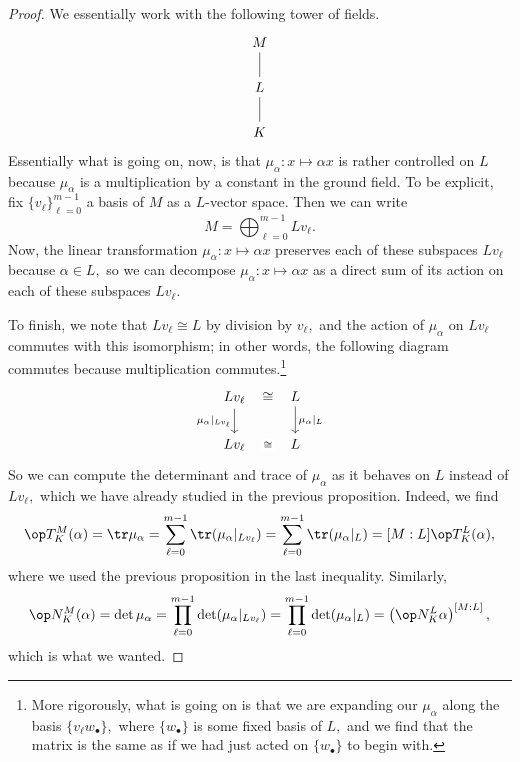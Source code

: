 \documentclass[../notes.tex]{subfiles}
\begin{document}
\begin{proof}
	We essentially work with the following tower of fields.
	\[\begin{tikzcd}
		M \\
		L \\
		K
		\arrow[no head, from=3-1, to=2-1]
		\arrow[no head, from=2-1, to=1-1]
	\end{tikzcd}\]
	Essentially what is going on, now, is that $\mu_\alpha:x\mapsto \alpha x$ is rather controlled on $L$ because $\mu_\alpha$ is a multiplication by a constant in the ground field. To be explicit, fix $\{v_\ell\}_{\ell=0}^{m-1}$ a basis of $M$ as a $L$-vector space. Then we can write
	\[M=\bigoplus_{\ell=0}^{m-1}Lv_\ell.\]
	Now, the linear transformation $\mu_\alpha:x\mapsto \alpha x$ preserves each of these subspaces $Lv_\ell$ because $\alpha\in L,$ so we can decompose $\mu_\alpha:x\mapsto \alpha x$ as a direct sum of its action on each of these subspaces $Lv_\ell.$

	To finish, we note that $Lv_\ell\cong L$ by division by $v_\ell,$ and the action of $\mu_\alpha$ on $Lv_\ell$ commutes with this isomorphism; in other words, the following diagram commutes because multiplication commutes.\footnote{More rigorously, what is going on is that we are expanding our $\mu_\alpha$ along the basis $\{v_\ell w_\bullet\},$ where $\{w_\bullet\}$ is some fixed basis of $L,$ and we find that the matrix is the same as if we had just acted on $\{w_\bullet\}$ to begin with.}
	\[\begin{tikzcd}
		{Lv_\ell} & {L} \\
		{Lv_\ell} & {L}
		\arrow["{\mu_\alpha|_{Lv_\ell}}"', from=1-1, to=2-1]
		\arrow["\cong"{marking}, draw=none, from=1-1, to=1-2]
		\arrow["\cong"{description}, draw=none, from=2-1, to=2-2]
		\arrow["{\mu_\alpha|_L}", from=1-2, to=2-2]
	\end{tikzcd}\]
	So we can compute the determinant and trace of $\mu_\alpha$ as it behaves on $L$ instead of $Lv_\ell,$ which we have already studied in the previous proposition. Indeed, we find
	\[\op T^M_K(\alpha)=\tr\mu_\alpha=\sum_{\ell=0}^{m-1}\tr(\mu_\alpha|_{Lv_\ell})=\sum_{\ell=0}^{m-1}\tr(\mu_\alpha|_L)=[M:L]\op T^L_K(\alpha),\]
	where we used the previous proposition in the last inequality. Similarly,
	\[\op N^M_K(\alpha)=\det\mu_\alpha=\prod_{\ell=0}^{m-1}\det(\mu_\alpha|_{Lv_\ell})=\prod_{\ell=0}^{m-1}\det(\mu_\alpha|_L)=\left(\op N^L_K\alpha\right)^{[M:L]},\]
	which is what we wanted.
\end{proof}
\end{document}
